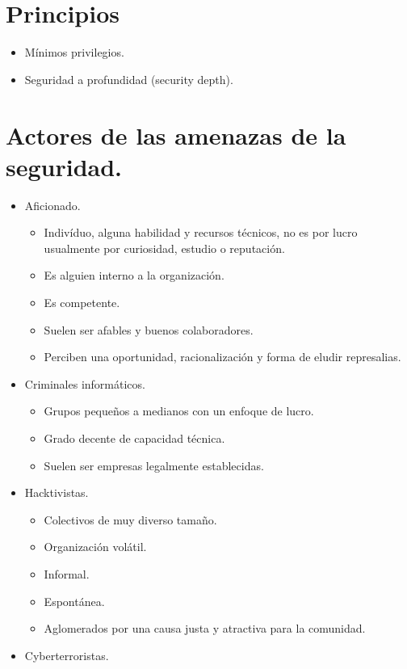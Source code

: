 \chapter{Principios}

\begin{itemize}
	\item M\'{i}nimos privilegios.
	\item Seguridad a profundidad (security depth).
\end{itemize}

\chapter{Actores de las amenazas de la seguridad.}

\begin{itemize}
	\item Aficionado.
	\begin{itemize}
		\item Indiv\'{i}duo, alguna habilidad y recursos t\'{e}cnicos, no es por lucro usualmente por curiosidad, estudio o reputaci\'{o}n.
		\item Es alguien interno a la organizaci\'{o}n.
		\item Es competente.
		\item Suelen ser afables y buenos colaboradores.
		\item Perciben una oportunidad, racionalizaci\'{o}n y forma de eludir represalias.
	\end{itemize}
	\item Criminales inform\'{a}ticos.
	\begin{itemize}
		\item Grupos peque\~{n}os a medianos con un enfoque de lucro.
		\item Grado decente de capacidad t\'{e}cnica.
		\item Suelen ser empresas legalmente establecidas.
	\end{itemize}
	\item Hacktivistas.
	\begin{itemize}
		\item Colectivos de muy diverso tama\~{n}o.
		\item Organizaci\'{o}n vol\'{a}til.
		\item Informal.
		\item Espont\'{a}nea.
		\item Aglomerados por una causa justa y atractiva para la comunidad.
	\end{itemize}
	\item Cyberterroristas.

\end{itemize}
